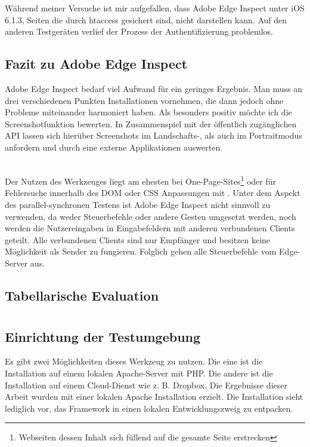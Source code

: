 		Während meiner Versuche ist mir aufgefallen, dass Adobe Edge Inspect unter iOS 6.1.3, Seiten die durch htaccess 				gesichert sind, nicht darstellen kann. Auf den anderen Testgeräten verlief der Prozess der Authentifizierung problemlos. 
		
		\pagebreak
		\subsection{Fazit zu Adobe Edge Inspect}
		Adobe Edge Inspect bedarf viel Aufwand für ein geringes Ergebnis. Man muss an drei verschiedenen Punkten Installationen vornehmen, die dann jedoch \mbox{ohne} Probleme miteinander harmoniert haben. Als besonders positiv möchte ich die Screenshotfunktion bewerten. In Zusammenspiel mit der öffentlich zugänglichen API lassen sich hierüber Screenshots im Landschafts-, als auch im Portraitmodus anfordern und durch eine externe Applikationen auswerten. 
		
		\\Der Nutzen des Werkzeuges liegt am ehesten bei One-Page-Sites\footnote{Webseiten dessen Inhalt sich füllend auf die gesamte Seite erstrecken} oder für Fehlersuche innerhalb des DOM oder CSS Anpassungen mit . Unter dem Aspekt des parallel-synchronen Testens ist Adobe Edge Inspect nicht sinnvoll zu verwenden, da weder Steuerbefehle oder andere Gesten umgesetzt werden, noch werden die Nutzereingaben in Eingabefeldern mit anderen verbundenen Clients geteilt. Alle verbundenen Clients sind nur Empfänger und besitzen keine Möglichkeit als Sender zu fungieren. Folglich gehen alle Steuerbefehle vom Edge-Server aus.
	
	\subsection{Tabellarische Evaluation}


	\pagebreak			
	\section{}
		\subsection {Einrichtung der Testumgebung}
		Es gibt zwei Möglichkeiten dieses Werkzeug zu nutzen. Die eine ist die Installation auf einem lokalen Apache-Server mit PHP. Die andere ist die Installation auf einem Cloud-Dienst wie z. B. Dropbox. Die Ergebnisse dieser Arbeit wurden mit einer lokalen Apache Installation erzielt. Die Installation sieht lediglich vor, das Framework in einen lokalen Entwicklungszweig zu entpacken.
		
